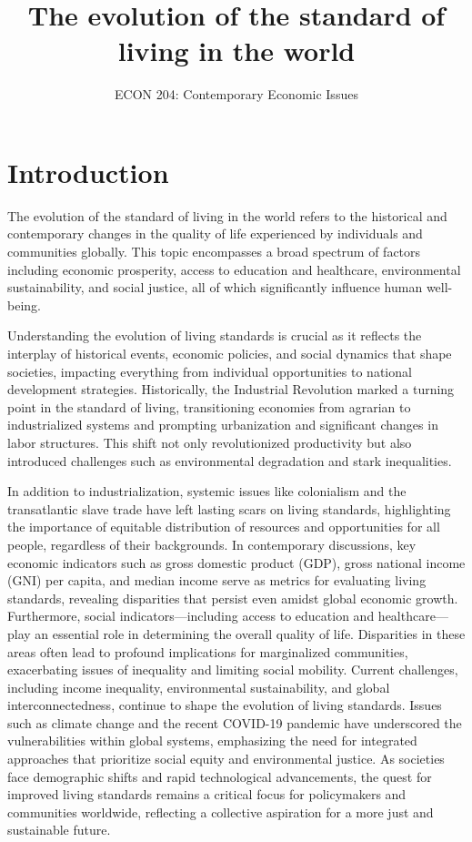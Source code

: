 \documentclass[12pt]{article}
\title{The evolution of the standard of living in the world}
\author{ECON 204: Contemporary Economic Issues}
\date{}
\begin{document}
\maketitle

\section{Introduction}
The evolution of the standard of living in the world refers to the historical and contemporary changes in the quality of life experienced by individuals and communities globally. This topic encompasses a broad spectrum of factors including economic prosperity, access to education and healthcare, environmental sustainability, and social justice, all of which significantly influence human well-being. 

Understanding the evolution of living standards is crucial as it reflects the interplay of historical events, economic policies, and social dynamics that shape societies, impacting everything from individual opportunities to national development strategies. Historically, the Industrial Revolution marked a turning point in the standard of living, transitioning economies from agrarian to industrialized systems and prompting urbanization and significant changes in labor structures. This shift not only revolutionized productivity but also introduced challenges such as environmental degradation and stark inequalities. 

In addition to industrialization, systemic issues like colonialism and the transatlantic slave trade have left lasting scars on living standards, highlighting the importance of equitable distribution of resources and opportunities for all people, regardless of their backgrounds.
In contemporary discussions, key economic indicators such as gross domestic
product (GDP), gross national income (GNI) per capita, and median income serve
as metrics for evaluating living standards, revealing disparities that persist even
amidst global economic growth. Furthermore, social indicators—including access to
education and healthcare—play an essential role in determining the overall quality
of life. Disparities in these areas often lead to profound implications for marginalized
communities, exacerbating issues of inequality and limiting social mobility.
Current challenges, including income inequality, environmental sustainability, and
global interconnectedness, continue to shape the evolution of living standards. Issues
such as climate change and the recent COVID-19 pandemic have underscored
the vulnerabilities within global systems, emphasizing the need for integrated approaches
that prioritize social equity and environmental justice. As societies face
demographic shifts and rapid technological advancements, the quest for improved
living standards remains a critical focus for policymakers and communities worldwide,
reflecting a collective aspiration for a more just and sustainable future.
\end{document}
